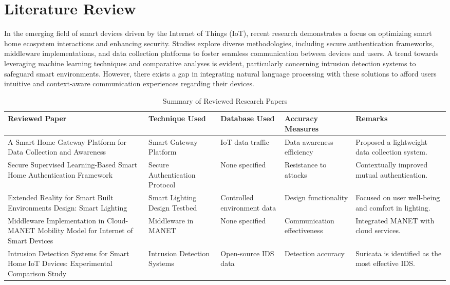 \documentclass[conference]{IEEEtran}
\begin{document}
\section{Literature Review}
\hspace{}In the emerging field of smart devices driven by the Internet of Things (IoT), recent research demonstrates a focus on optimizing smart home ecosystem interactions and enhancing security. Studies explore diverse methodologies, including secure authentication frameworks, middleware implementations, and data collection platforms to foster seamless communication between devices and users. A trend towards leveraging machine learning techniques and comparative analyses is evident, particularly concerning intrusion detection systems to safeguard smart environments. However, there exists a gap in integrating natural language processing with these solutions to afford users intuitive and context-aware communication experiences regarding their devices.

\begin{table}[h]
\centering
\begin{tabular}{|p{1.3cm}|p{1.3cm}|p{1.3cm}|p{1.3cm}|p{1.3cm}|}
\hline
\textbf{Reviewed Paper} & \textbf{Technique Used} & \textbf{Database Used} & \textbf{Accuracy Measures} & \textbf{Remarks} \\ \hline
A Smart Home Gateway Platform for Data Collection and Awareness & Smart Gateway Platform & IoT data traffic & Data awareness efficiency & Proposed a lightweight data collection system. \\ \hline
Secure Supervised Learning-Based Smart Home Authentication Framework & Secure Authentication Protocol & None specified & Resistance to attacks & Contextually improved mutual authentication. \\ \hline
Extended Reality for Smart Built Environments Design: Smart Lighting & Smart Lighting Design Testbed & Controlled environment data & Design functionality & Focused on user well-being and comfort in lighting. \\ \hline
Middleware Implementation in Cloud-MANET Mobility Model for Internet of Smart Devices & Middleware in MANET & None specified & Communication effectiveness & Integrated MANET with cloud services. \\ \hline
Intrusion Detection Systems for Smart Home IoT Devices: Experimental Comparison Study & Intrusion Detection Systems & Open-source IDS data & Detection accuracy & Suricata is identified as the most effective IDS. \\ \hline
\end{tabular}
\caption{Summary of Reviewed Research Papers}
\label{tab:research_summary}
\end{table}
\end{document}
